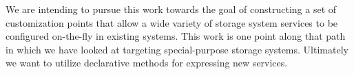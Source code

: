 \documentclass[preprint]{sigplanconf-eurosys}
\begin{document}
We are intending to pursue this work towards the goal of constructing a set of
customization points that allow a wide variety of storage system services to be
configured on-the-fly in existing systems. This work is one point along that
path in which we have looked at targeting special-purpose storage systems.
Ultimately we want to utilize declarative methods for expressing new services.



\end{document}
